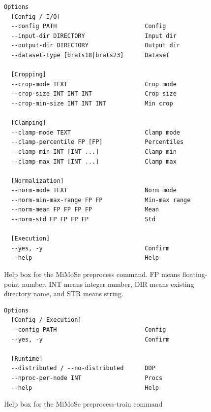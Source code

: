 \documentclass{article}
\begin{document}
\begin{figure}[h]
\centering
\begin{tcolorbox}[
  colback=lightgreenbg,
  colframe=lightgreenframe,
  arc=2mm,
  boxrule=0.6pt,
  title=MiMoSe preprocess,
  fonttitle=\bfseries
]
\begin{Verbatim}[breaklines=true,breakanywhere=true,fontsize=\small]
Options
  [Config / I/O]
  --config PATH                         Config
  --input-dir DIRECTORY                 Input dir
  --output-dir DIRECTORY                Output dir
  --dataset-type [brats18|brats23]      Dataset

  [Cropping]
  --crop-mode TEXT                      Crop mode
  --crop-size INT INT INT               Crop size
  --crop-min-size INT INT INT           Min crop

  [Clamping]
  --clamp-mode TEXT                     Clamp mode
  --clamp-percentile FP [FP]            Percentiles
  --clamp-min INT [INT ...]             Clamp min
  --clamp-max INT [INT ...]             Clamp max

  [Normalization]
  --norm-mode TEXT                      Norm mode
  --norm-min-max-range FP FP            Min-max range
  --norm-mean FP FP FP FP               Mean
  --norm-std FP FP FP FP                Std

  [Execution]
  --yes, -y                             Confirm
  --help                                Help
\end{Verbatim}
\end{tcolorbox}
\caption{Help box for the MiMoSe preprocess command. FP means floating-point number, INT means integer number, DIR means existing directory name, and STR means string.}
\label{fig:mimose_preprocess}
\end{figure}

\begin{figure}[h]
\centering
\begin{tcolorbox}[
  colback=lightgreenbg,
  colframe=lightgreenframe,
  arc=2mm,
  boxrule=0.6pt,
  title=MiMoSe preprocess-train,
  fonttitle=\bfseries
]
\begin{Verbatim}[breaklines=true,breakanywhere=true,fontsize=\small]
Options
  [Config / Execution]
  --config PATH                         Config
  --yes, -y                             Confirm

  [Runtime]
  --distributed / --no-distributed      DDP
  --nproc-per-node INT                  Procs
  --help                                Help
\end{Verbatim}
\end{tcolorbox}
\caption{Help box for the MiMoSe preprocess-train command}
\label{fig:mimose_preprocess_train}
\end{figure}
\end{document}
